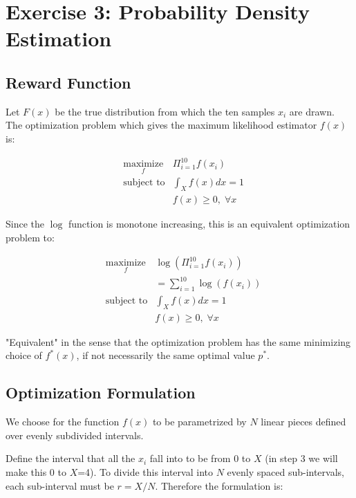 \documentclass[a4paper]{article}
\begin{document}
\section{Exercise 3: Probability Density Estimation}
\subsection{Reward Function}
Let $F(x)$ be the true distribution from which the ten samples $x_i$ are drawn.
The optimization problem which gives the maximum likelihood estimator $f(x)$ is:

\begin{equation*}
\begin{aligned}
& \underset{f}{\text{maximize}}
&  \Pi_{i=1}^{10} f(x_i) \\
& \text{subject to}
&  \int_X f(x) dx = 1 \\
& & f(x) \geq 0, \; \forall x
\end{aligned}
\end{equation*}

Since the $\log$ function is monotone increasing, this is an equivalent optimization problem to:

\begin{equation*}
\begin{aligned}
& \underset{f}{\text{maximize}}
&  \log \left( \Pi_{i=1}^{10} f(x_i) \right) \\
& &  = \sum_{i=1}^{10} \log(f(x_i)) \\
& \text{subject to}
&  \int_X f(x) dx = 1 \\
& & f(x) \geq 0, \; \forall x
\end{aligned}
\end{equation*}

"Equivalent" in the sense that the optimization problem has the same minimizing choice of $f^*(x)$,
if not necessarily the same optimal value $p^*$.

\subsection{Optimization Formulation}
We choose for the function $f(x)$ to be parametrized by $N$ linear pieces defined over evenly subdivided intervals.

Define the interval that all the $x_i$ fall into to be from 0 to $X$ (in step 3 we will make this 0 to $X$=4).
To divide this interval into $N$ evenly spaced sub-intervals, each sub-interval must be $r=X/N$.
Therefore the formulation is:
\end{document}
